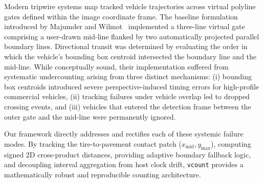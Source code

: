Modern tripwire systems map tracked vehicle trajectories across virtual polyline gates defined within the image coordinate frame. The baseline formulation introduced by Majumder and Wilmot~\cite{majumder2023automated} implemented a three-line virtual gate comprising a user-drawn mid-line flanked by two automatically projected parallel boundary lines. Directional transit was determined by evaluating the order in which the vehicle's bounding box centroid intersected the boundary line and the mid-line. While conceptually sound, their implementation suffered from systematic undercounting arising from three distinct mechanisms: (i) bounding box centroids introduced severe perspective-induced timing errors for high-profile commercial vehicles, (ii) tracking failures under vehicle overlap led to dropped crossing events, and (iii) vehicles that entered the detection frame between the outer gate and the mid-line were permanently ignored. 

Our framework directly addresses and rectifies each of these systemic failure modes. By tracking the tire-to-pavement contact patch ($x_{\text{mid}}, y_{\text{max}}$), computing signed 2D cross-product distances, providing adaptive boundary fallback logic, and decoupling interval aggregation from host clock drift, \texttt{vcount} provides a mathematically robust and reproducible counting architecture.
